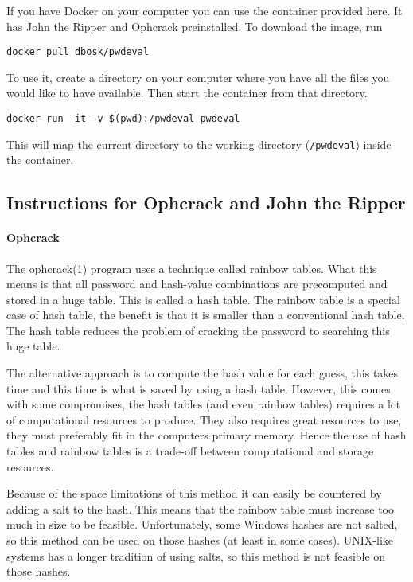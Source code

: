 If you have Docker on your computer you can use the container provided here.
It has John the Ripper and Ophcrack preinstalled.
To download the image, run
\begin{verbatim}
docker pull dbosk/pwdeval
\end{verbatim}

To use it, create a directory on your computer where you have all the files you 
would like to have available.
Then start the container from that directory.
\begin{verbatim}
docker run -it -v $(pwd):/pwdeval pwdeval
\end{verbatim}
This will map the current directory to the working directory (\verb'/pwdeval') 
inside the container.


\subsection{Instructions for Ophcrack and John the Ripper}

\paragraph{Ophcrack}

The ophcrack(1) program uses a technique called rainbow tables.
What this means is that all password and hash-value combinations are 
precomputed and stored in a huge table.
This is called a hash table.
The rainbow table is a special case of hash table, the benefit is that it is 
smaller than a conventional hash table.
The hash table reduces the problem of cracking the password to searching this 
huge table.

The alternative approach is to compute the hash value for each guess, this 
takes time and this time is what is saved by using a hash table.
However, this comes with some compromises, the hash tables (and even rainbow 
tables) requires a lot of computational resources to produce.
They also requires great resources to use, they must preferably fit in the 
computers primary memory.
Hence the use of hash tables and rainbow tables is a trade-off between 
computational and storage resources.

Because of the space limitations of this method it can easily be countered by 
adding a salt to the hash.
This means that the rainbow table must increase too much in size to be 
feasible.
Unfortunately, some Windows hashes are not salted, so this method can be used 
on those hashes (at least in some cases).
UNIX-like systems has a longer tradition of using salts, so this method is not 
feasible on those hashes.

